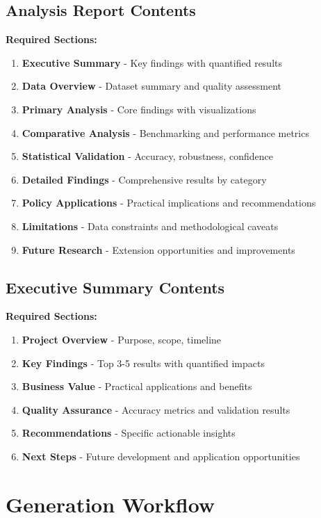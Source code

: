 \documentclass[11pt,letterpaper]{article}
\begin{document}
\subsection{Analysis Report Contents}
\textbf{Required Sections:}
\begin{enumerate}
    \item \textbf{Executive Summary} - Key findings with quantified results
    \item \textbf{Data Overview} - Dataset summary and quality assessment
    \item \textbf{Primary Analysis} - Core findings with visualizations
    \item \textbf{Comparative Analysis} - Benchmarking and performance metrics
    \item \textbf{Statistical Validation} - Accuracy, robustness, confidence
    \item \textbf{Detailed Findings} - Comprehensive results by category
    \item \textbf{Policy Applications} - Practical implications and recommendations
    \item \textbf{Limitations} - Data constraints and methodological caveats
    \item \textbf{Future Research} - Extension opportunities and improvements
\end{enumerate}

\subsection{Executive Summary Contents}
\textbf{Required Sections:}
\begin{enumerate}
    \item \textbf{Project Overview} - Purpose, scope, timeline
    \item \textbf{Key Findings} - Top 3-5 results with quantified impacts
    \item \textbf{Business Value} - Practical applications and benefits
    \item \textbf{Quality Assurance} - Accuracy metrics and validation results
    \item \textbf{Recommendations} - Specific actionable insights
    \item \textbf{Next Steps} - Future development and application opportunities
\end{enumerate}

\section{Generation Workflow}
\end{document}
